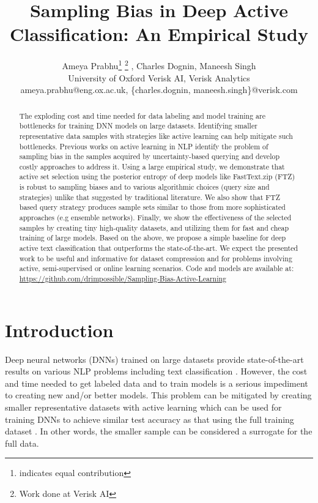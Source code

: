 \documentclass[11pt,a4paper]{article}
\title{Sampling Bias in Deep Active Classification: An Empirical Study}
\author{Ameya Prabhu\thanks{ \hspace{0.1cm} indicates equal contribution}  \hspace{0.05cm}\thanks{ \hspace{0.1cm} Work done at Verisk  AI}  , Charles Dognin\footnotemark[1] , Maneesh Singh \\
University of Oxford \qquad Verisk  AI, Verisk Analytics \\
ameya.prabhu@eng.ox.ac.uk, \{charles.dognin, maneesh.singh\}@verisk.com\\}
\begin{document}
\maketitle
\begin{abstract}
The exploding cost and time needed for data labeling and model training are bottlenecks for training DNN models on large datasets. Identifying smaller representative data samples with strategies like active learning can help mitigate such bottlenecks. Previous works on active learning in NLP identify the problem of sampling bias in the samples acquired by uncertainty-based querying and develop costly approaches to address it. Using a large empirical study, we demonstrate that active set selection using the posterior entropy of deep models like FastText.zip (FTZ) is robust to sampling biases and to various algorithmic choices (query size and strategies) unlike that suggested by traditional literature. We also show that FTZ based query strategy produces sample sets similar to those from more sophisticated approaches (e.g ensemble networks). Finally, we show the effectiveness of the selected samples by creating tiny high-quality datasets, and utilizing them for fast and cheap training of large models. Based on the above, we propose a simple baseline for deep active text classification that outperforms the state-of-the-art. We expect the presented work to be useful and informative for dataset compression and for problems involving active, semi-supervised or online learning scenarios. Code and models are available at: \href{https://github.com/drimpossible/Sampling-Bias-Active-Learning}{https://github.com/drimpossible/Sampling-Bias-Active-Learning}


\end{abstract} \section{Introduction}
\label{sec:introduction}


Deep neural networks (DNNs) trained on large datasets provide state-of-the-art results on various NLP problems \cite{devlin2018bert} including text classification \cite{howard2018universal}. However, the cost and time needed to get labeled data and to train models is a serious impediment to creating new and/or better models. This problem can be mitigated by creating smaller representative datasets with active learning which can be used for training DNNs to achieve similar test accuracy as that using the full training dataset . In other words, the smaller sample can be considered a surrogate for the full data. 
\end{document}
